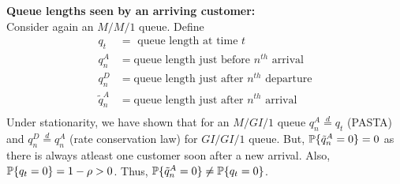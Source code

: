 \documentclass[all-lectures.tex]{subfiles}
\begin{document}
\noindent \textbf{Queue lengths seen by an arriving customer:} \\
\indent Consider again an $M/M/1$ queue. Define 
\begin{align*}
q_t &= \text{ queue length at time $t$} \\
q_n^A &= \text{queue length just before $n^{th}$ arrival} \\
q_n^D &= \text{queue length just after $n^{th}$ departure} \\
\tilde{q}_n^A &= \text{queue length just after $n^{th}$ arrival} \\
\end{align*}
Under stationarity, we have shown that for an $M/GI/1$ queue $q^A_n \stackrel{d}{=} q_t$ (PASTA) and $q^D_n \stackrel{d}{=} q^A_n$ (rate conservation law) for $GI/GI/1$ queue. But, $\P\{\tilde{q}^A_n = 0\} =0$ as there is always atleast one customer soon after a new arrival. Also, $\P\{q_t = 0\} = 1-\rho > 0$. Thus, $\P\{\tilde{q}^A_n = 0\} \neq \P\{q_t = 0\}$.
\end{document}
